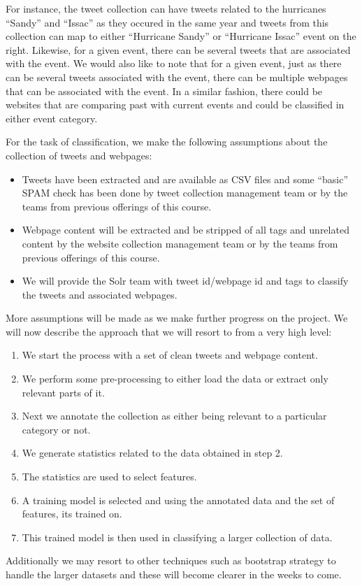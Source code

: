 For instance, the tweet collection  can have tweets related to the hurricanes ``Sandy'' and ``Issac'' as they occured in the same year and tweets from this collection can map to either ``Hurricane Sandy'' or ``Hurricane Issac'' event on the right. Likewise, for a given event, there can be several tweets that are associated with the event. We would also like to note that for a given event, just as there can be several tweets associated with the event, there can be multiple webpages that can be associated with the event. In a similar fashion, there could be websites that are comparing past with current events and could be classified in either event category.

For the task of classification, we make the following assumptions about the collection of tweets and webpages:
\begin{itemize}
\item Tweets have been extracted and are available as CSV files and some ``basic'' SPAM check has been done by tweet collection management team or by the teams from previous offerings of this course.
\item Webpage content will be extracted and be stripped of all tags and unrelated content by the website collection management team or by the teams from previous offerings of this course.
\item We will provide the Solr team with tweet id/webpage id and tags to classify the tweets and associated webpages.
\end{itemize}

More assumptions will be made as we make further progress on the project. We will now describe the approach that we will resort to from a very high level:

\begin{enumerate}
\item We start the process with a set of clean tweets and webpage content.
\item We perform some pre-processing to either load the data or extract only relevant parts of it.
\item Next we annotate the collection as either being relevant to a particular category or not.
\item We generate statistics related to the data obtained in step 2. 
\item The statistics are used to select features.
\item A training model is selected and using the annotated data and the set of features, its trained on.
\item This trained model is then used in classifying a larger collection of data.
\end{enumerate}

Additionally we may resort to other techniques such as bootstrap strategy to handle the larger datasets and these will become clearer in the weeks to come.
